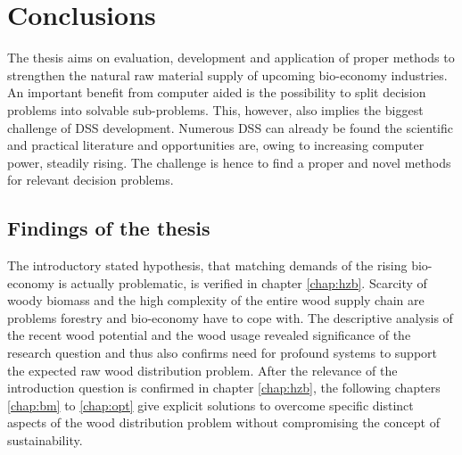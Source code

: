 \chapter{Conclusions}
\label{chap:discussion}
\newpage
\noindent
The thesis aims on evaluation, development and application of proper methods to strengthen the natural raw material supply of upcoming bio-economy industries. An important benefit from computer aided is the possibility to split decision problems into solvable sub-problems. This, however, also implies the biggest challenge of DSS development. Numerous DSS can already be found the scientific and practical literature and opportunities are, owing to increasing computer power, steadily rising. The challenge is hence to find a proper and novel methods for relevant decision problems.

\section{Findings of the thesis}
\label{sec:discussion:findings}
The introductory stated hypothesis, that matching demands of the rising bio-economy is actually problematic, is verified in chapter \ref{chap:hzb}. Scarcity of woody biomass and the high complexity of the entire wood supply chain are problems forestry and bio-economy have to cope with. The descriptive analysis of the recent wood potential and the wood usage revealed significance of the research question and thus also confirms need for profound systems to support the expected raw wood distribution problem. After the relevance of the introduction question is confirmed in chapter \ref{chap:hzb}, the following chapters \ref{chap:bm} to \ref{chap:opt} give explicit solutions to overcome specific distinct aspects of the wood distribution problem without compromising the concept of sustainability.

